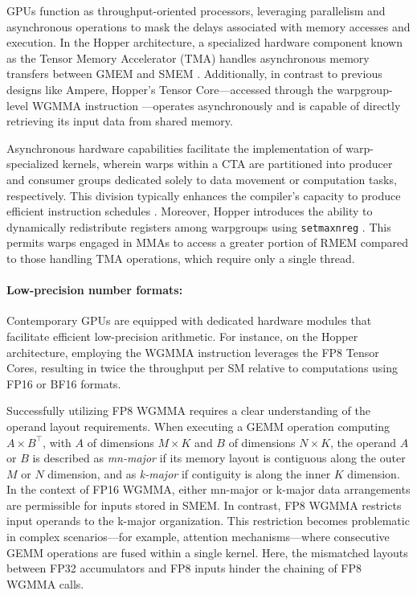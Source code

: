 GPUs function as throughput-oriented processors, leveraging parallelism and asynchronous operations to mask the delays associated with memory accesses and execution. In the Hopper architecture, a specialized hardware component known as the Tensor Memory Accelerator (TMA) handles asynchronous memory transfers between GMEM and SMEM \cite[\S7.29]{cuda}. Additionally, in contrast to previous designs like Ampere, Hopper's Tensor Core—accessed through the warpgroup-level WGMMA instruction \cite[\S9.7.14]{ptx}—operates asynchronously and is capable of directly retrieving its input data from shared memory.

Asynchronous hardware capabilities facilitate the implementation of warp-specialized kernels, wherein warps within a CTA are partitioned into producer and consumer groups dedicated solely to data movement or computation tasks, respectively. This division typically enhances the compiler’s capacity to produce efficient instruction schedules \citep{warp-specialization-2011}. Moreover, Hopper introduces the ability to dynamically redistribute registers among warpgroups using \verb|setmaxnreg| \cite[\S9.7.17.1]{ptx}. This permits warps engaged in MMAs to access a greater portion of RMEM compared to those handling TMA operations, which require only a single thread.

\paragraph{Low-precision number formats:}
\label{sec:low-precision-gpu}
Contemporary GPUs are equipped with dedicated hardware modules that facilitate efficient low-precision arithmetic. For instance, on the Hopper architecture, employing the WGMMA instruction leverages the FP8 Tensor Cores, resulting in twice the throughput per SM relative to computations using FP16 or BF16 formats.

Successfully utilizing FP8 WGMMA requires a clear understanding of the operand layout requirements. When executing a GEMM operation computing $A \times B^{\top}$, with $A$ of dimensions $M\times K$ and $B$ of dimensions $N\times K$, the operand $A$ or $B$ is described as \emph{mn-major} if its memory layout is contiguous along the outer $M$ or $N$ dimension, and as \emph{k-major} if contiguity is along the inner $K$ dimension. In the context of FP16 WGMMA, either mn-major or k-major data arrangements are permissible for inputs stored in SMEM. In contrast, FP8 WGMMA restricts input operands to the k-major organization. This restriction becomes problematic in complex scenarios—for example, attention mechanisms—where consecutive GEMM operations are fused within a single kernel. Here, the mismatched layouts between FP32 accumulators and FP8 inputs hinder the chaining of FP8 WGMMA calls.

